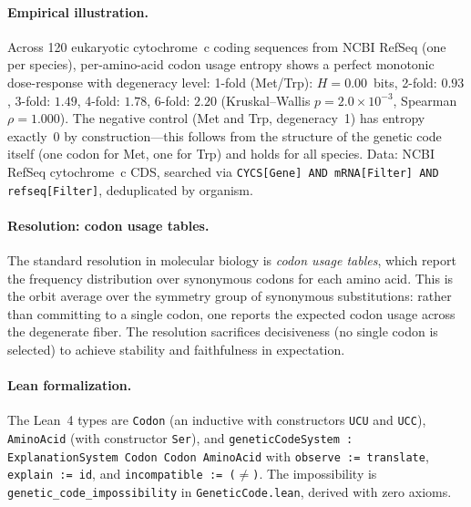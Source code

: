 \paragraph{Empirical illustration.}
Across 120 eukaryotic cytochrome~c coding sequences from NCBI RefSeq
(one per species), per-amino-acid codon usage entropy shows a perfect
monotonic dose-response with degeneracy level: 1-fold (Met/Trp):
$H = 0.00$~bits, 2-fold: $0.93$, 3-fold: $1.49$, 4-fold: $1.78$,
6-fold: $2.20$ (Kruskal--Wallis $p = 2.0 \times 10^{-3}$, Spearman
$\rho = 1.000$).  The negative control (Met and Trp, degeneracy~1) has
entropy exactly~0 by construction---this follows from the structure of the
genetic code itself (one codon for Met, one for Trp) and holds for all
species.  Data: NCBI RefSeq cytochrome~c CDS, searched via
\texttt{CYCS[Gene] AND mRNA[Filter] AND refseq[Filter]}, deduplicated by
organism.

\paragraph{Resolution: codon usage tables.}
The standard resolution in molecular biology is \emph{codon usage tables},
which report the frequency distribution over synonymous codons for each amino
acid.  This is the orbit average over the symmetry group of synonymous
substitutions: rather than committing to a single codon, one reports the
expected codon usage across the degenerate fiber.  The resolution sacrifices
decisiveness (no single codon is selected) to achieve stability and
faithfulness in expectation.

\paragraph{Lean formalization.}
The Lean~4 types are \texttt{Codon} (an inductive with constructors
\texttt{UCU} and \texttt{UCC}), \texttt{AminoAcid} (with constructor
\texttt{Ser}), and \texttt{geneticCodeSystem : ExplanationSystem Codon Codon
AminoAcid} with \texttt{observe := translate}, \texttt{explain := id}, and
\texttt{incompatible := ($\ne$)}.
The impossibility is \texttt{genetic\_code\_impossibility} in
\texttt{GeneticCode.lean}, derived with zero axioms.

